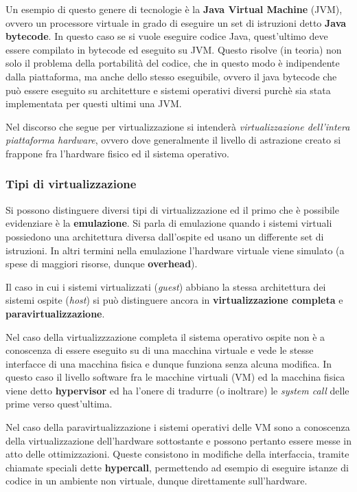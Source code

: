 Un esempio di questo genere di tecnologie è la \textbf{Java Virtual
Machine} (JVM), ovvero un processore virtuale in grado di eseguire un
set di istruzioni detto \textbf{Java bytecode}. In questo caso se si
vuole eseguire codice Java, quest'ultimo deve essere compilato in
bytecode ed eseguito su JVM. Questo risolve (in teoria) non solo il
problema della portabilità del codice, che in questo modo è indipendente
dalla piattaforma, ma anche dello stesso eseguibile, ovvero il java
bytecode che può essere eseguito su architetture e sistemi operativi
diversi purchè sia stata implementata per questi ultimi una JVM.

Nel discorso che segue per virtualizzazione si intenderà
\emph{virtualizzazione dell'intera piattaforma hardware}, ovvero dove
generalmente il livello di astrazione creato si frappone fra l'hardware
fisico ed il sistema operativo.

\subsubsection{Tipi di virtualizzazione}\label{tipi-di-virtualizzazione}

Si possono distinguere diversi tipi di virtualizzazione ed il primo che
è possibile evidenziare è la \textbf{emulazione}. Si parla di emulazione
quando i sistemi virtuali possiedono una architettura diversa
dall'ospite ed usano un differente set di istruzioni. In altri termini
nella emulazione l'hardware virtuale viene simulato (a spese di maggiori
risorse, dunque \textbf{overhead}).

Il caso in cui i sistemi virtualizzati (\emph{guest}) abbiano la stessa
architettura dei sistemi ospite (\emph{host}) si può distinguere ancora
in \textbf{virtualizzazione completa} e \textbf{paravirtualizzazione}.

Nel caso della virtualizzzazione completa il sistema operativo ospite
non è a conoscenza di essere eseguito su di una macchina virtuale e vede
le stesse interfacce di una macchina fisica e dunque funziona senza
alcuna modifica. In questo caso il livello software fra le macchine
virtuali (VM) ed la macchina fisica viene detto \textbf{hypervisor} ed
ha l'onere di tradurre (o inoltrare) le \emph{system call} delle prime
verso quest'ultima.

Nel caso della paravirtualizzazione i sistemi operativi delle VM sono a
conoscenza della virtualizzazione dell'hardware sottostante e possono
pertanto essere messe in atto delle ottimizzazioni. Queste consistono in
modifiche della interfaccia, tramite chiamate speciali dette
\textbf{hypercall}, permettendo ad esempio di eseguire istanze di codice
in un ambiente non virtuale, dunque direttamente sull'hardware.

